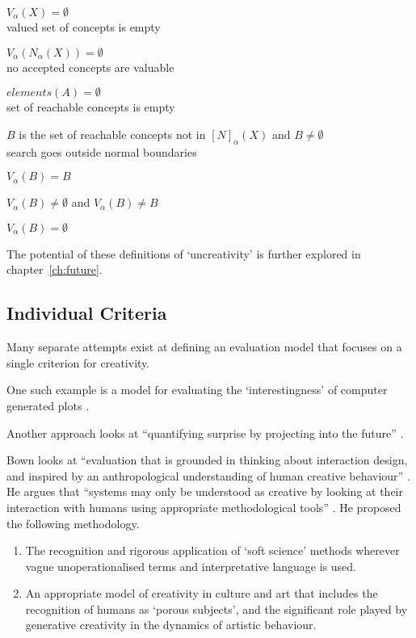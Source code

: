 \begin{description}[leftmargin=6cm]
  \item [Hopeless Uninspiration] $V_\alpha (X) = \emptyset$\\ valued set of concepts is empty
  \item [Conceptual Uninspiration] $V_\alpha (N_\alpha (X)) = \emptyset$\\ no accepted concepts are valuable
  \item [Generative Uninspiration] $elements(A) = \emptyset$\\ set of reachable concepts is empty
  \item [Aberration] $B$ is the set of reachable concepts not in $[N]_\alpha (X)$ and $B \neq \emptyset$\\ search goes outside normal boundaries
  \item [Perfect Aberration] $V_\alpha (B) = B$
  \item [Productive Aberration] $V_\alpha (B) \neq \emptyset$ and $V_\alpha (B) \neq B$
  \item [Pointless Aberration] $V_\alpha (B) = \emptyset$
\end{description}

The potential of these definitions of `uncreativity' is further explored in chapter~\ref{ch:future}.


\subsection{Individual Criteria}
\label{s:indcrit}

Many separate attempts exist at defining an evaluation model that focuses on a single criterion for creativity.

One such example is a model for evaluating the `interestingness' of computer generated plots \autocite{Perez2013}.

Another approach looks at ``quantifying surprise by projecting into the future'' \autocite{Maher2013}.

Bown looks at ``evaluation that is grounded in thinking about interaction design, and inspired by an anthropological understanding of human creative behaviour'' \autocite*{Bown2014}. He argues that ``systems may only be understood as creative by looking at their interaction with humans using appropriate methodological tools'' \autocite*{Bown2014}. He proposed the following methodology.

\begin{enumerate}
  \item The recognition and rigorous application of `soft science' methods wherever vague unoperationalised terms and interpretative language is used.
  \item An appropriate model of creativity in culture and art that includes the recognition of humans as `porous subjects', and the significant role played by generative creativity in the dynamics of artistic behaviour.
\end{enumerate}

